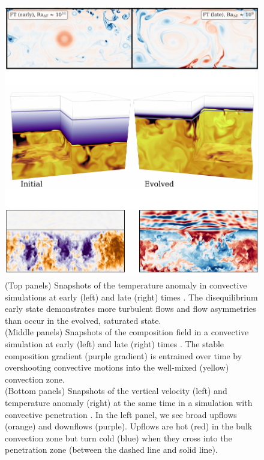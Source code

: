 \documentclass[12pt]{article}
\begin{document}
\begin{figure}
    \centering
    \vspace{-0.5cm}
    \includegraphics[width=\textwidth]{past_collage.pdf}
    \vspace{-1cm}
    \caption{(Top panels) Snapshots of the temperature anomaly in convective simulations at early (left) and late (right) times \citep{anders_etal_2020}.
    The disequilibrium early state demonstrates more turbulent flows and flow asymmetries than occur in the evolved, saturated state.
    \\
    (Middle panels) Snapshots of the composition field in a convective simulation at early (left) and late (right) times \citep{anders_etal_2022b}.
    The stable composition gradient (purple gradient) is entrained over time by overshooting convective motions into the well-mixed (yellow) convection zone.
    \\
    (Bottom panels) Snapshots of the vertical velocity (left) and temperature anomaly (right) at the same time in a simulation with convective penetration \citep{anders_etal_2022a}.
    In the left panel, we see broad upflows (orange) and downflows (purple).
    Upflows are hot (red) in the bulk convection zone but turn cold (blue) when they cross into the penetration zone (between the dashed line and solid line).
    \label{fig:past}
    }
\end{figure}
\end{document}

